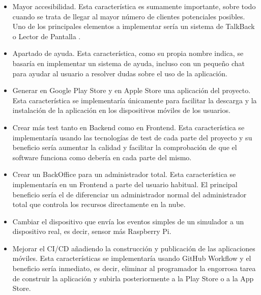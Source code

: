 \begin{itemize}
    \item Mayor accesibilidad. Esta característica es sumamente importante, sobre todo cuando se trata de llegar al mayor número de clientes potenciales posibles. Uno de los principales elementos a implementar sería un sistema de TalkBack o Lector de Pantalla \cite{talkback}.
    \item Apartado de ayuda. Esta característica, como su propia nombre indica, se basaría en implementar un sistema de ayuda, incluso con un pequeño chat para ayudar al usuario a resolver dudas sobre el uso de la aplicación.
    \item Generar en Google Play Store y en Apple Store una aplicación del proyecto. Esta característica se implementaría únicamente para facilitar la descarga y la instalación de la aplicación en los dispositivos móviles de los usuarios.
    \item Crear más test tanto en Backend como en Frontend. Esta característica se implementaría usando las tecnologías de test de cada parte del proyecto y su beneficio sería aumentar la calidad y facilitar la comprobación de que el software funciona como debería en cada parte del mismo.
    \item Crear un BackOffice para un administrador total. Esta característica se implementaría en un Frontend a parte del usuario habitual. El principal beneficio sería el de diferenciar un administrador normal del administrador total que controla los recursos directamente en la nube.
    \item Cambiar el dispositivo que envía los eventos simples de un simulador a un dispositivo real, es decir, sensor más Raspberry Pi.
    \item Mejorar el CI/CD añadiendo la construcción y publicación de las aplicaciones móviles. Esta características se implementaría usando GitHub Workflow y el beneficio sería inmediato, es decir, eliminar al programador la engorrosa tarea de construir la aplicación y subirla posteriormente a la Play Store o a la App Store.
\end{itemize}